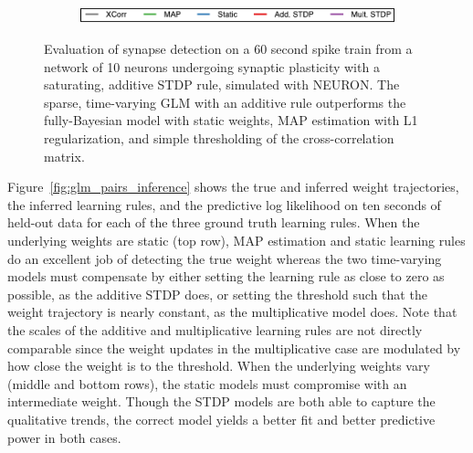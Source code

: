 \begin{figure}[t!]
\begin{subfigure}[T]{\textwidth}
  \centering
  \includegraphics[height=1.25em]{figures/ch6/fig5_legend}    
  \end{subfigure}
  \caption[Dynamic link prediction on data generated from NEURON]{
    Evaluation of synapse detection on a 60 second spike train
    from a network of 10 neurons undergoing synaptic plasticity with a
    saturating, additive STDP rule, simulated with NEURON. The sparse,
    time-varying GLM with an additive rule outperforms the
    fully-Bayesian model with static weights, MAP estimation with L1
    regularization, and simple thresholding of the cross-correlation
    matrix. }
  \label{fig:pynn_roc}
  \vspace{-1em}
\end{figure}

Figure~\ref{fig:glm_pairs_inference} shows the true and inferred
weight trajectories, the inferred learning rules, and the predictive
log likelihood on ten seconds of held-out data for each of the three
ground truth learning rules. When the underlying weights are static
(top row), MAP estimation and static learning rules do an excellent
job of detecting the true weight whereas the two time-varying models
must compensate by either setting the learning rule as close to zero
as possible, as the additive STDP does, or setting the threshold such
that the weight trajectory is nearly constant, as the multiplicative
model does. Note that the scales of the additive and multiplicative
learning rules are not directly comparable since the weight updates in
the multiplicative case are modulated by how close the weight is to
the threshold. When the underlying weights vary (middle and bottom
rows), the static models must compromise with an intermediate
weight. Though the STDP models are both able to capture the
qualitative trends, the correct model yields a better fit and better
predictive power in both cases.

